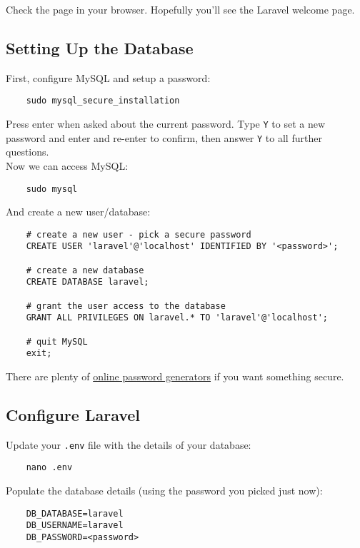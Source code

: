 Check the page in your browser. Hopefully you'll see the Laravel welcome page.


\subsection{Setting Up the Database}

First, configure MySQL and setup a password:

\begin{verbatim}
    sudo mysql_secure_installation
\end{verbatim}

Press enter when asked about the current password. Type \texttt{Y} to set a new password and enter and re-enter to confirm, then answer \texttt{Y} to all further questions.
\\

Now we can access MySQL:

\begin{verbatim}
    sudo mysql
\end{verbatim}

And create a new user/database:

\begin{verbatim}
    # create a new user - pick a secure password
    CREATE USER 'laravel'@'localhost' IDENTIFIED BY '<password>';

    # create a new database
    CREATE DATABASE laravel;

    # grant the user access to the database
    GRANT ALL PRIVILEGES ON laravel.* TO 'laravel'@'localhost';

    # quit MySQL
    exit;
\end{verbatim}

There are plenty of \href{https://generatepasswords.org}{online password generators} if you want something secure.

\subsection{Configure Laravel}

Update your \texttt{.env} file with the details of your database:

\begin{verbatim}
    nano .env
\end{verbatim}

Populate the database details (using the password you picked just now):

\begin{verbatim}
    DB_DATABASE=laravel
    DB_USERNAME=laravel
    DB_PASSWORD=<password>
\end{verbatim}

